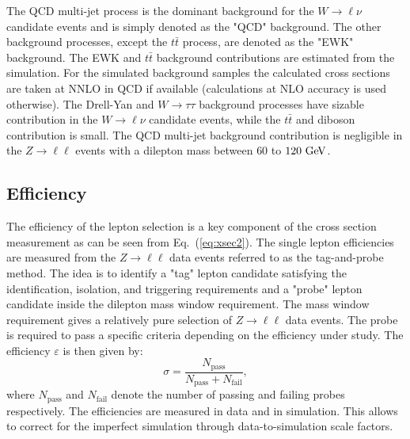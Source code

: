 The QCD multi-jet process is the dominant background for the $W \rightarrow \ell\nu$ candidate events and is simply denoted as the "QCD" background.  The other background processes, except the $t\bar{t}$ process, are denoted as the "EWK" background. The EWK and $t\bar{t}$ background contributions are estimated from the simulation. For the simulated background samples the calculated cross sections are taken at NNLO in QCD if available (calculations at NLO accuracy is used otherwise). The  Drell-Yan and $W\rightarrow \tau\tau$ background processes have sizable contribution in the $W \rightarrow \ell\nu$ candidate events, while the $t\bar{t}$ and diboson contribution is small. The QCD multi-jet background contribution is negligible in the $Z \rightarrow \ell\ell$ events with a dilepton mass between $60$ to $120~\mathrm{Ge\kern -0.1em V}$.    

\subsection{Efficiency}

The efficiency of the lepton selection is a key component of the cross section measurement as can be seen from Eq.~(\ref{eq:xsec2}). The single lepton efficiencies are measured from the $Z \rightarrow \ell\ell$ data events referred to as the tag-and-probe method. The idea is to identify a "tag" lepton candidate satisfying the identification, isolation, and triggering requirements and a "probe" lepton candidate inside the dilepton mass window requirement. The mass window requirement gives a relatively pure selection of  $Z \rightarrow \ell\ell$ data events. The probe is required to pass a specific criteria depending on the efficiency under study. The efficiency $\varepsilon$ is then given by:
\begin{equation} \label{eq:eff}
\sigma = \frac{N_{\mathrm{pass}}}{N_{\mathrm{pass}}+N_{\mathrm{fail}}},
\end{equation}
where $N_{\mathrm{pass}}$ and $N_{\mathrm{fail}}$ denote the number of passing and failing probes respectively. The efficiencies are measured in data and in simulation. This allows to correct for the imperfect simulation through data-to-simulation scale factors.   

